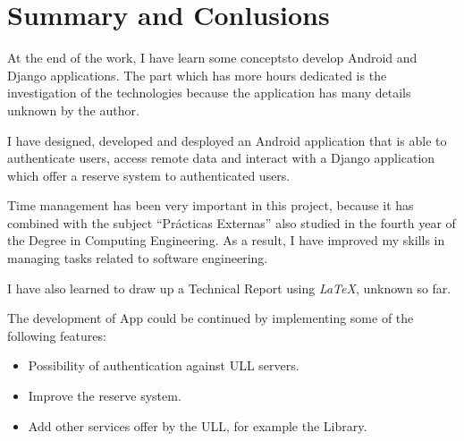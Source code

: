 %
%
%
%
\chapter{Summary and Conlusions}
At the end of the work, I have learn some conceptsto develop Android and Django applications. The part which has more hours dedicated is the investigation of the technologies because the application has many details unknown by the author.

I have designed, developed and desployed an Android application that is able to authenticate users, access remote data and interact with a Django application which offer a reserve system to authenticated users.

Time management has been very important in this project, because it has combined with the subject ``Prácticas Externas'' also studied in the fourth year 
of the Degree in Computing Engineering. 
As a result, I have improved my skills in managing tasks related to software engineering.

I have also learned to draw up a Technical Report using \textit{LaTeX}, unknown so far.

The development of App could be continued by implementing some of the following features:
\begin{itemize}
\item Possibility of authentication against ULL servers. 
\item Improve the reserve system.
\item Add other services offer by the ULL, for example the Library.
\end{itemize}
